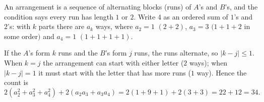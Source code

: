 An arrangement is a sequence of alternating blocks (runs) of $A$'s and $B$'s, and the condition says every run has length $1$ or $2$. Write $4$ as an ordered sum of $1$'s and $2$'s: with $k$ parts there are $a_k$ ways, where $a_2=1$ $(2+2)$, $a_3=3$ $(1+1+2$ in some order$)$ and $a_4=1$ $(1+1+1+1)$.

If the $A$'s form $k$ runs and the $B$'s form $j$ runs, the runs alternate, so $|k-j|\le1$. When $k=j$ the arrangement can start with either letter ($2$ ways); when $|k-j|=1$ it must start with the letter that has more runs ($1$ way). Hence the count is
\[
2\left(a_2^2+a_3^2+a_4^2\right)+2\left(a_2a_3+a_3a_4\right)=2(1+9+1)+2(3+3)=22+12=\boxed{34}.
\]
